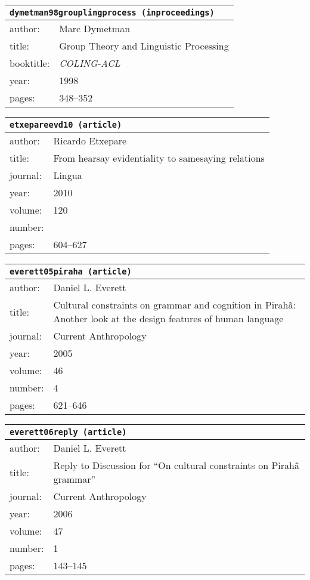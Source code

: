 \documentclass{article}
\begin{document}
\bigskip

\begin{tabular}{p{}p{}}
\multicolumn{2}{l}{\texttt{dymetman98grouplingprocess (inproceedings)}}\\
\hline
author: & Marc Dymetman\\
title: & Group Theory and Linguistic Processing\\
booktitle: & \textsc{{\sl COLING-ACL}}\\
year: & 1998\\
pages: & 348--352\\
\end{tabular}

\bigskip

\begin{tabular}{p{}p{}}
\multicolumn{2}{l}{\texttt{etxepareevd10 (article)}}\\
\hline
author: & Ricardo Etxepare\\
title: & From hearsay evidentiality to samesaying relations\\
journal: & Lingua\\
year: & 2010\\
volume: & 120\\
number: & \\
pages: & 604--627\\
\end{tabular}

\bigskip

\begin{tabular}{p{}p{}}
\multicolumn{2}{l}{\texttt{everett05piraha (article)}}\\
\hline
author: & Daniel L. Everett\\
title: & Cultural constraints on grammar and cognition in \textsc{P}irah{\~a}: Another look at the design features of human language\\
journal: & Current Anthropology\\
year: & 2005\\
volume: & 46\\
number: & 4\\
pages: & 621--646\\
\end{tabular}

\bigskip

\begin{tabular}{p{}p{}}
\multicolumn{2}{l}{\texttt{everett06reply (article)}}\\
\hline
author: & Daniel L. Everett\\
title: & Reply to \textsc{D}iscussion for ``\textsc{O}n cultural constraints on \textsc{P}irah{\~a} grammar''\\
journal: & Current Anthropology\\
year: & 2006\\
volume: & 47\\
number: & 1\\
pages: & 143--145\\
\end{tabular}
\end{document}
